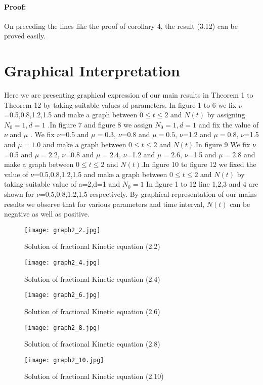 \documentclass{article}
\begin{document}
\paragraph{Proof:}
On preceding the lines like the proof of corollary 4, the result (3.12) can be proved easily.

\section{Graphical Interpretation}
Here we are presenting graphical expression of our main results in Theorem 1 to Theorem 12 by taking suitable values of parameters. In figure 1 to 6  we fix $\nu$=0.5,0.8,1.2,1.5 and make  a graph between $0 \leq t \leq 2$ and $N(t)$ by assigning $N_0 = 1, d= 1$ .In figure 7 and figure  8  we assign $N_0 = 1, d= 1$ and fix the value of $\nu$ and $\mu$ . We fix $\nu$=0.5 and $\mu =0.3$, $\nu$=0.8 and $\mu =0.5$, $\nu$=1.2 and $\mu =0.8$, $\nu$=1.5 and $\mu =1.0$ and make a graph between $0 \leq t \leq 2$ and $N(t)$.In figure 9  We fix $\nu$=0.5 and $\mu =2.2$, $\nu$=0.8 and $\mu =2.4$, $\nu$=1.2 and $\mu =2.6$, $\nu$=1.5 and $\mu =2.8$ and make a graph between $0 \leq t \leq 2$ and $N(t)$.In figure 10  to figure  12  we fixed the value of $\nu$=0.5,0.8,1.2,1.5 and  make a graph between $0 \leq t \leq 2$ and $N(t)$ by taking suitable value of a=2,d=1 and $N_0 = 1$ In figure 1 to 12 line 1,2,3 and 4 are shown for  $\nu$=0.5,0.8,1.2,1.5 respectively. By graphical representation of our mains results we observe that for various parameters and time interval, $N (t)$ can be negative as well as positive.
\begin{figure}[H]
    \centering
    \texttt{[image: graph2\_2.jpg]}
    \caption{Solution of fractional Kinetic equation (2.2)}
\end{figure}
\begin{figure}[H]
    \centering
    \texttt{[image: graph2\_4.jpg]}
    \caption{Solution of fractional Kinetic equation (2.4)}
\end{figure}
\begin{figure}[H]
    \centering
    \texttt{[image: graph2\_6.jpg]}
    \caption{Solution of fractional Kinetic equation (2.6)}
\end{figure}
\begin{figure}[H]
    \centering
    \texttt{[image: graph2\_8.jpg]}
    \caption{Solution of fractional Kinetic equation (2.8)}
\end{figure}
\begin{figure}[H]
    \centering
    \texttt{[image: graph2\_10.jpg]}
    \caption{Solution of fractional Kinetic equation (2.10)}
\end{figure}
\end{document}
